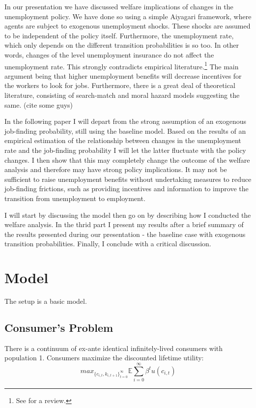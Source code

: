 \documentclass[a4paper,12pt]{article}
\begin{document}
In our presentation we have discussed welfare implications of changes in the unemployment policy. We have done so using a simple Aiyagari framework, where agents are subject to exogenous unemployment shocks. These shocks are assumed to be independent of the policy itself. Furthermore, the unemployment rate, which only depends on the different transition probabilities is so too. In other words, changes of the level unemployment insurance do not affect the unemployment rate. This strongly contradicts empirical literature.\footnote{See \citep{decker} for a review.} The main argument being that higher unemployment benefits will decrease incentives for the workers to look for jobs. Furthermore, there is a great deal of theoretical literature, consisting of search-match and moral hazard models suggesting the same. (cite some guys) 

In the following paper I will depart from the strong assumption of an exogenous job-finding probability, still using the baseline model. Based on the results of an empirical estimation of the relationship between changes in the unemployment rate and the job-finding probability I will let the latter fluctuate with the policy changes. I then show that this may completely change the outcome of the welfare analysis and therefore may have strong policy implications. It may not be sufficient to raise unemployment benefits without undertaking measures to reduce job-finding frictions, such as providing incentives and information to improve the transition from unemployment to employment.

I will start by discussing the model then go on by describing how I conducted the welfare analysis. In the thrid part I present my results after a brief summary of the results presented during our presentation - the baseline case with exogenous transition probabilities. Finally, I conclude with a critical discussion.



\section{Model}

The setup is a basic \cite{aiyagari} model. 

\subsection{Consumer's Problem}

There is a continuum of ex-ante identical infinitely-lived consumers with population 1. Consumers maximize the discounted lifetime utility: 
\[ 
 max_{\{{ c_{i,t}, k_{i,t+1} }\}_{t = 0}^{\infty}} {\mathbb{E}} \sum_{i=0}^{\infty} \beta^{t}  u(c_{i,t}) 
 \]
\end{document}
